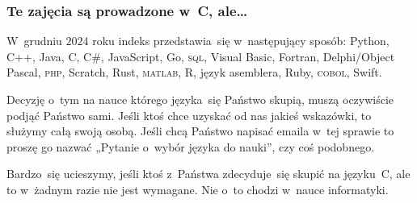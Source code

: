 \documentclass[10pt,t]{beamer}
\begin{document}
\begin{frame}
  \frametitle{Te zajęcia są prowadzone w~C, ale\ldots}


  W~grudniu $2024$ roku indeks
  przedstawia~się w~następujący sposób: Python, C++, Java, C, C\#,
  JavaScript, Go, \textsc{sql}, Visual Basic, Fortran, Delphi/Object
  Pascal, \textsc{php}, Scratch, Rust, \textsc{matlab}, R, język asemblera,
  Ruby, \textsc{cobol}, Swift.

  Decyzję o~tym na nauce którego języka~się Państwo skupią, muszą
  oczywiście podjąć Państwo sami. Jeśli ktoś chce uzyskać od nas jakieś
  wskazówki, to służymy całą swoją osobą. Jeśli chcą Państwo napisać emaila
  w~tej sprawie to proszę go nazwać „Pytanie o~wybór języka do nauki”, czy
  coś podobnego.

  Bardzo~się ucieszymy, jeśli ktoś z~Państwa zdecyduje~się skupić na
  języku~C, ale to w~żadnym razie nie jest wymagane. Nie o~to chodzi w~nauce
  informatyki.

\end{frame}
\end{document}
